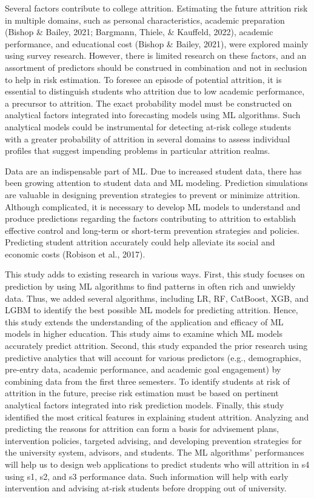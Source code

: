 \documentclass[12pt,a4paper,oneside]{book}
\begin{document}
Several factors contribute to college attrition.  Estimating the future attrition risk in multiple domains, such as personal characteristics, academic preparation (Bishop \& Bailey, 2021; Bargmann, Thiele, \& Kauffeld, 2022), academic performance, and educational cost (Bishop \& Bailey, 2021), were explored mainly using survey research.  However, there is limited research on these factors, and an assortment of predictors should be construed in combination and not in seclusion to help in risk estimation.  To foresee an episode of potential attrition, it is essential to distinguish students who attrition due to low academic performance, a precursor to attrition.  The exact probability model must be constructed on analytical factors integrated into forecasting models using ML algorithms.  Such analytical models could be instrumental for detecting at-risk college students with a greater probability of attrition in several domains to assess individual profiles that suggest impending problems in particular attrition realms.   

Data are an indispensable part of ML.  Due to increased student data, there has been growing attention to student data and ML modeling.  Prediction simulations are valuable in designing prevention strategies to prevent or minimize attrition.  Although complicated, it is necessary to develop ML models to understand and produce predictions regarding the factors contributing to attrition to establish effective control and long-term or short-term prevention strategies and policies.  Predicting student attrition accurately could help alleviate its social and economic costs (Robison et al., 2017). 

This study adds to existing research in various ways. First, this study focuses on prediction by using ML algorithms to find patterns in often rich and unwieldy data. Thus, we added several algorithms, including LR, RF, CatBoost, XGB, and LGBM to identify the best possible ML models for predicting attrition.  Hence, this study extends the understanding of the application and efficacy of ML models in higher education.  This study aims to examine which ML models accurately predict attrition.  Second, this study expanded the prior research using predictive analytics that will account for various predictors (e.g., demographics, pre-entry data, academic performance, and academic goal engagement) by combining data from the first three semesters.  To identify students at risk of attrition in the future, precise risk estimation must be based on pertinent analytical factors integrated into risk prediction models.  Finally, this study identified the most critical features in explaining student attrition.  Analyzing and predicting the reasons for attrition can form a basis for advisement plans, intervention policies, targeted advising, and developing prevention strategies for the university system, advisors, and students.  The ML algorithms’ performances will help us to design web applications to predict students who will attrition in s4 using s1, s2, and s3 performance data.  Such information will help with early intervention and advising at-risk students before dropping out of university.   
\end{document}
